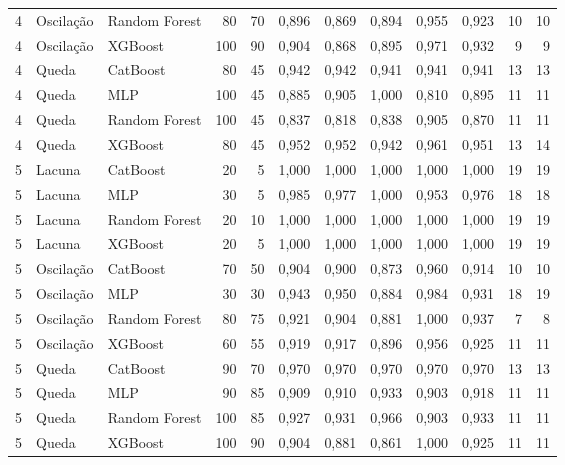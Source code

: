 \begin{longtable}{@{}rllrrrrrrrrr@{}}
4 & Oscilação & Random Forest & 80 & 70 & 0,896 & 0,869 & 0,894 & 0,955 & 0,923 & 10 & 10 \\
4 & Oscilação & XGBoost & 100 & 90 & 0,904 & 0,868 & 0,895 & 0,971 & 0,932 & 9 & 9 \\
4 & Queda & CatBoost & 80 & 45 & 0,942 & 0,942 & 0,941 & 0,941 & 0,941 & 13 & 13 \\
4 & Queda & MLP & 100 & 45 & 0,885 & 0,905 & 1,000 & 0,810 & 0,895 & 11 & 11 \\
4 & Queda & Random Forest & 100 & 45 & 0,837 & 0,818 & 0,838 & 0,905 & 0,870 & 11 & 11 \\
4 & Queda & XGBoost & 80 & 45 & 0,952 & 0,952 & 0,942 & 0,961 & 0,951 & 13 & 14 \\
5 & Lacuna & CatBoost & 20 & 5 & 1,000 & 1,000 & 1,000 & 1,000 & 1,000 & 19 & 19 \\
5 & Lacuna & MLP & 30 & 5 & 0,985 & 0,977 & 1,000 & 0,953 & 0,976 & 18 & 18 \\
5 & Lacuna & Random Forest & 20 & 10 & 1,000 & 1,000 & 1,000 & 1,000 & 1,000 & 19 & 19 \\
5 & Lacuna & XGBoost & 20 & 5 & 1,000 & 1,000 & 1,000 & 1,000 & 1,000 & 19 & 19 \\
5 & Oscilação & CatBoost & 70 & 50 & 0,904 & 0,900 & 0,873 & 0,960 & 0,914 & 10 & 10 \\
5 & Oscilação & MLP & 30 & 30 & 0,943 & 0,950 & 0,884 & 0,984 & 0,931 & 18 & 19 \\
5 & Oscilação & Random Forest & 80 & 75 & 0,921 & 0,904 & 0,881 & 1,000 & 0,937 & 7 & 8 \\
5 & Oscilação & XGBoost & 60 & 55 & 0,919 & 0,917 & 0,896 & 0,956 & 0,925 & 11 & 11 \\
5 & Queda & CatBoost & 90 & 70 & 0,970 & 0,970 & 0,970 & 0,970 & 0,970 & 13 & 13 \\
5 & Queda & MLP & 90 & 85 & 0,909 & 0,910 & 0,933 & 0,903 & 0,918 & 11 & 11 \\
5 & Queda & Random Forest & 100 & 85 & 0,927 & 0,931 & 0,966 & 0,903 & 0,933 & 11 & 11 \\
5 & Queda & XGBoost & 100 & 90 & 0,904 & 0,881 & 0,861 & 1,000 & 0,925 & 11 & 11 \\
\end{longtable}
